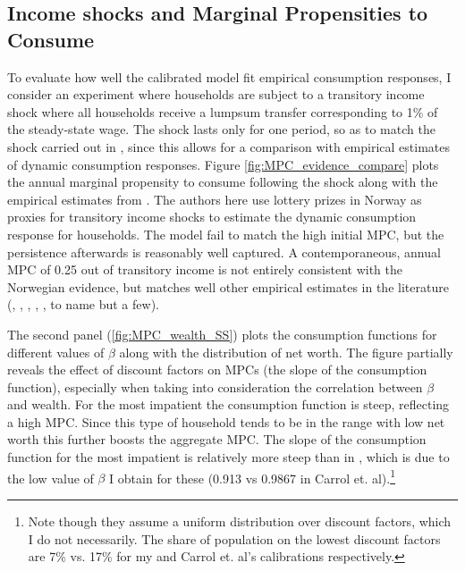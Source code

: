 \subsection{Income shocks and Marginal Propensities to Consume}
To evaluate how well the calibrated model fit empirical consumption responses, I consider an experiment where households are subject to a transitory income shock where all households receive a lumpsum transfer corresponding to 1\% of the steady-state wage. The shock lasts only for one period, so as to match the shock carried out in \citet{auclert2018intertemporal}, since this allows for a comparison with empirical estimates of dynamic consumption responses. Figure \ref{fig:MPC_evidence_compare} plots the annual marginal propensity to consume following the shock along with the empirical estimates from \citet{fagereng2019mpc}. The authors here use lottery prizes in Norway as proxies for transitory income shocks to estimate the dynamic consumption response for households. The model fail to match the high initial MPC, but the persistence afterwards is reasonably well captured. A contemporaneous, annual MPC of 0.25 out of transitory income is not entirely consistent with the Norwegian evidence, but matches well other empirical estimates in the literature (\citet{souleles1999response}, \citet{shapiro2003consumer}, \citet{johnson2006household}, \citet{shapiro2009did}, \citet{sahm2010household}, \citet{broda2014economic} to name but a few).

The second panel (\ref{fig:MPC_wealth_SS}) plots the consumption functions for different values of $\beta$ along with the distribution of net worth. The figure partially reveals the effect of discount factors on MPCs (the slope of the consumption function), especially when taking into consideration the correlation between $\beta$ and wealth. For the most impatient the consumption function is steep, reflecting a high MPC. Since this type of household tends to be in the range with low net worth this further boosts the aggregate MPC. The slope of the consumption function for the most impatient is relatively more steep than in \citet{carroll2017distribution}, which is due to the low value of $\beta$ I obtain for these (0.913 vs 0.9867 in Carrol et. al).\footnote{Note though they assume a uniform distribution over discount factors, which I do not necessarily. The share of population on the lowest discount factors are 7\% vs. 17\% for my and Carrol et. al's calibrations respectively.  } 



